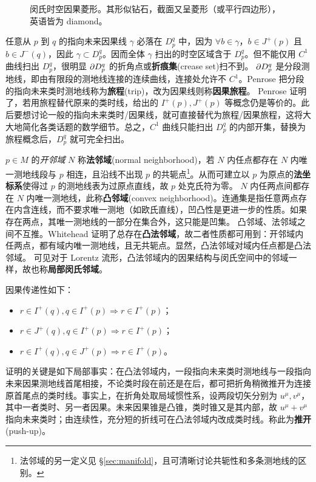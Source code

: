 \begin{figure}
    \centering
    \caption{\small 闵氏时空因果菱形。其形似钻石，截面又呈菱形（或平行四边形），英语皆为 diamond。}
\end{figure}
任意从 $p$ 到 $q$ 的指向未来因果线 $\gamma$ 必落在 $D_p^q$ 中，因为 $\forall b\in\gamma$，$b\in J^+(p)$ 且 $b\in J^-(q)$，因此 $\gamma\subset D_p^q$。因而全体 $\gamma$ 扫出的时空区域含于 $D_p^q$。但不能仅用 $C^1$ 曲线扫出 $D_p^q$，很明显 $\partial D_p^q$ 的折角点或\textbf{折痕集}(crease set)扫不到。
$\partial D_p^q$ 是分段测地线，即由有限段的测地线连接的连续曲线，连接处允许不 $C^1$。Penrose 把分段的指向未来类时测地线称为\textbf{旅程}(trip)，改为因果线则称\textbf{因果旅程}。
Penrose 证明了，若用旅程替代原来的类时线，给出的 $I^+(p),J^+(p)$ 等概念仍是等价的。此后要想讨论一般的指向未来类时/因果线，就可直接替代为旅程/因果旅程，这将大大地简化各类话题的数学细节。总之，$C^1$ 曲线只能扫出 $D_p^q$ 的内部开集，替换为旅程概念后，$D_p^q$ 就可完全扫出。

$p\in M$ 的\textit{开邻域} $N$ 称\textbf{法邻域}(normal neighborhood)，若 $N$ 内任点都存在 $N$ 内唯一测地线段与 $p$ 相连，且沿线不出现 $p$ 的共轭点\footnote{法邻域的另一定义见 \S\ref{sec:manifold}，且可清晰讨论共轭性和多条测地线的区别。}。从而可建立以 $p$ 为原点的\textbf{法坐标系}使得过 $p$ 的测地线表为过原点直线，故 $p$ 处克氏符为零。
$N$ 内任两点间都存在 $N$ 内唯一测地线，此称\textbf{凸邻域}(convex neighborhood)。连通集是指任意两点存在内含连线，而不要求唯一测地（如欧氏直线），凹凸性是更进一步的性质。如果存在两点，其唯一测地线的一部分在集合外，这只能是凹集。
凸邻域、法邻域之间不互推。Whitehead 证明了总存在\textbf{凸法邻域}，故二者性质都可用到：开邻域内任两点，都有域内唯一测地线，且无共轭点。显然，凸法邻域对域内任点都是凸法邻域。
可见对于 Lorentz 流形，凸法邻域内的因果结构与闵氏空间中的邻域一样，故也称\textbf{局部闵氏邻域}。

因果传递性如下：
\begin{itemize}
    \item $r\in I^+(q), q\in I^+(p) \Rightarrow r\in I^+(p)$；
    \item $r\in J^+(q), q\in I^+(p) \Rightarrow r\in I^+(p)$；
    \item $r\in I^+(q), q\in J^+(p) \Rightarrow r\in I^+(p)$。
\end{itemize}
证明的关键是如下局部事实：在凸法邻域内，一段指向未来类时测地线与一段指向未来因果测地线首尾相接，不论类时段在前还是在后，都可把折角稍微推开为连接原首尾点的类时线。事实上，在折角处取局域惯性系，设两段切矢分别为 $u^\mu,v^\mu$，其中一者类时、另一者因果。未来因果锥是凸锥，类时锥又是其内部，故 $u^\mu+v^\mu$ 指向未来类时；由连续性，充分短的折线可在凸法邻域内改成类时线。称此为\textbf{推开}(push-up)。

